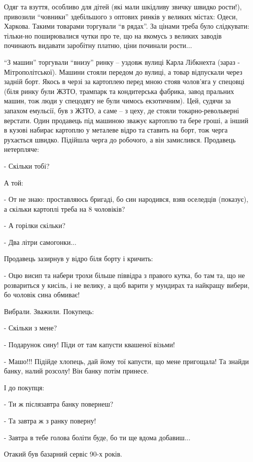 Одяг та взуття, особливо для дітей (які мали шкідливу звичку швидко рости!),
привозили \enquote{човники} здебільшого з оптових ринків у великих містах: Одеси,
Харкова. Такими товарами торгували \enquote{в рядах}. За цінами треба було слідкувати:
тільки-но поширювалися чутки про те, що на якомусь з великих заводів починають
видавати заробітну платню, ціни починали рости...

\enquote{З машин} торгували \enquote{внизу} ринку – уздовж вулиці Карла Лібкнехта (зараз -
Мітрополітської). Машини стояли передом до вулиці, а товар відпускали через
задній борт. Якось в черзі за картоплею перед мною стояв чолов’яга у
спецовці (біля ринку були ЖЗТО, трампарк та кондитерська фабрика, завод
пральних машин, тож люди у спецодягу не були чимось екзотичним). Цей, судячи
за запахом емульсії, був з ЖЗТО, а саме – з цеху, де стояли
токарно-револьверні верстати.  Один продавець під машиною зважує картоплю та
бере гроші, а інший в кузові набирає картоплю у металеве відро та ставить на
борт, тож черга рухається швидко. Підійшла черга до робочого, а він
замислився. Продавець нетерпляче:

- Скільки тобі? 

А той:

- От не знаю: проставляюсь бригаді, бо син народився, взяв оселедців (показує),
а скільки картоплі треба на 8 чоловіків?

- А горілки скільки?

- Два літри самогонки...

Продавець зазирнув у відро біля борту і кричить:

- Оцю висип та набери трохи більше піввідра з правого кутка, бо там та, що не
розвариться у кисіль, і не велику, а щоб варити у мундирах та найкращу вибери,
бо чоловік сина обмиває!

Вибрали. Зважили. Покупець:

- Скільки з мене? 

- Подарунок сину! Піди от там капусти квашеної візьми! 

- Машо!!! Підійде хлопець, дай йому тої капусти, що мене пригощала! Та знайди
банку, налий розсолу! Він банку потім принесе.

І до покупця:

- Ти ж післязавтра банку повернеш?

- Та завтра ж з ранку поверну!

- Завтра в тебе голова боліти буде, бо ти ще вдома добавиш...

Отакий був базарний сервіс 90-х років.

